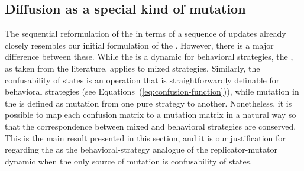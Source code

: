 \subsection{Diffusion as a special kind of mutation}
\label{sec:diffusion-as-special}

The sequential reformulation of the \rmd in terms of a sequence of
updates already closely resembles our initial formulation of the
\rdd. However, there is a major difference between these. While the
\rdd is a dynamic for behavioral strategies, the \rmd, as taken from
the literature, applies to mixed strategies. Similarly, the
confusability of states is an operation that is straightforwardly
definable for behavioral strategies (see
Equations~(\ref{eq:confusion-function})), while mutation in the \rmd
is defined as mutation from one pure strategy to another. Nonetheless,
it is possible to map each confusion matrix to a mutation matrix in a
natural way so that the correspondence between mixed and behavioral
strategies are conserved. This is the main result presented in this
section, and it is our justification for regarding the \rdd as the
behavioral-strategy analogue of the replicator-mutator dynamic when
the only source of mutation is confusability of states.

